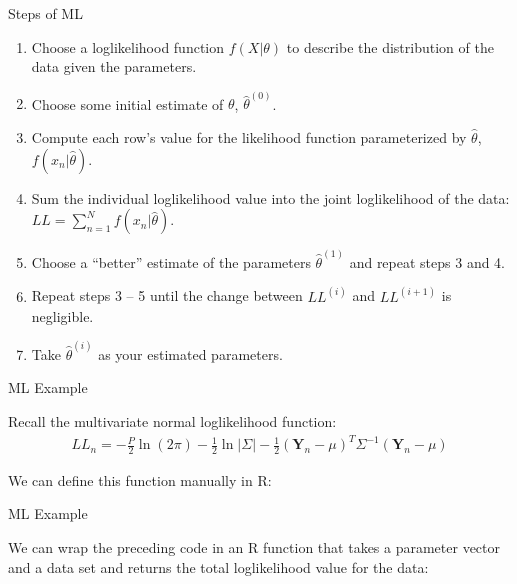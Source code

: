 \documentclass{beamer}
\begin{document}
\begin{frame}{Steps of ML}

  \begin{enumerate}
    \item Choose a loglikelihood function $f(X|\theta)$ to describe
      the distribution of the data given the parameters.
      \vspace{6pt}
    \item Choose some initial estimate of $\theta$, $\hat{\theta}^{(0)}$.
      \vspace{6pt}
    \item Compute each row's value for the likelihood function
      parameterized by $\hat{\theta}$, $f(x_n|\hat{\theta})$.
      \vspace{6pt}
    \item Sum the individual loglikelihood value into the joint
      loglikelihood of the data: $LL = \sum_{n = 1}^N
      f(x_n|\hat{\theta})$.
      \vspace{6pt}
    \item Choose a ``better'' estimate of the parameters
      $\hat{\theta}^{(1)}$ and repeat steps 3 and 4.
      \vspace{6pt}
    \item Repeat steps 3 -- 5 until the change between $LL^{(i)}$ and
      $LL^{(i + 1)}$ is negligible.
      \vspace{6pt}
    \item Take $\hat{\theta}^{(i)}$ as your estimated parameters.
  \end{enumerate}

\end{frame}


\begin{frame}{ML Example}

  Recall the multivariate normal loglikelihood function:
  \begin{align*}
    \textit{LL}_n = -\frac{P}{2} \ln(2\pi) - \frac{1}{2} \ln | \Sigma
    | - \frac{1}{2} (\mathbf{Y}_n - \mu)^T \Sigma^{-1}(\mathbf{Y}_n -
    \mu) \label{llEq}
  \end{align*}

  \vspace{12pt}

  We can define this function manually in \textsf{R}:



\end{frame}


\begin{frame}{ML Example}

  We can wrap the preceding code in an \textsf{R} function that takes
  a parameter vector and a data set and returns the total loglikelihood
  value for the data:



\end{frame}
\end{document}
